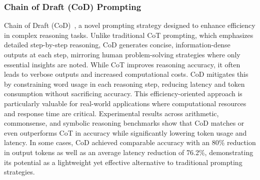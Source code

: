 \documentclass{article}
\begin{document}
\subsubsection{Chain of Draft (CoD) Prompting}
\label{CoD}
\noindent Chain of Draft (CoD)~\citep{xu2025chaindraftthinkingfaster}, a novel prompting strategy designed to enhance efficiency in complex reasoning tasks. Unlike traditional CoT prompting, which emphasizes detailed step-by-step reasoning, CoD generates concise, information-dense outputs at each step, mirroring human problem-solving strategies where only essential insights are noted. While CoT improves reasoning accuracy, it often leads to verbose outputs and increased computational costs. CoD mitigates this by constraining word usage in each reasoning step, reducing latency and token consumption without sacrificing accuracy. This efficiency-oriented approach is particularly valuable for real-world applications where computational resources and response time are critical. Experimental results across arithmetic, commonsense, and symbolic reasoning benchmarks show that CoD matches or even outperforms CoT in accuracy while significantly lowering token usage and latency. In some cases, CoD achieved comparable accuracy with an 80\% reduction in output tokens as well as an average latency reduction of 76.2\%, demonstrating its potential as a lightweight yet effective alternative to traditional prompting strategies.
\end{document}
